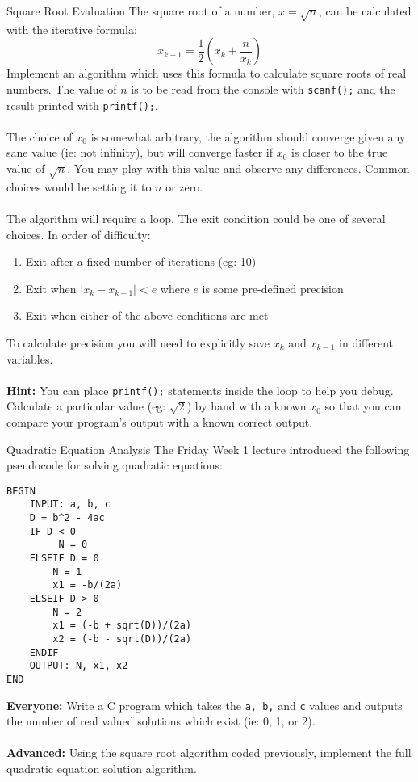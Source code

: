 \documentclass{lab}
\begin{document}
\begin{task}{Square Root Evaluation}{}
The square root of a number, $x = \sqrt{n}$, can be calculated with the iterative formula:
\begin{equation}
x_{k+1} = \frac{1}{2}\left(x_k + \frac{n}{x_k}\right)
\end{equation}
Implement an algorithm which uses this formula to calculate square roots of real numbers. The value of $n$ is to be read from the console with \texttt{scanf();} and the result printed with \texttt{printf();}.
\\ \\
The choice of $x_0$ is somewhat arbitrary, the algorithm should converge given any sane value (ie: not infinity), but will converge faster if $x_0$ is closer to the true value of $\sqrt{n}$. You may play with this value and observe any differences. Common choices would be setting it to $n$ or zero.
\\ \\
The algorithm will require a loop. The exit condition could be one of several choices. In order of difficulty:
\begin{enumerate}
\item Exit after a fixed number of iterations (eg: 10)
\item Exit when $\left| x_k - x_{k-1} \right| < e$ where $e$ is some pre-defined precision
\item Exit when either of the above conditions are met
\end{enumerate}

To calculate precision you will need to explicitly save $x_k$ and $x_{k-1}$ in different variables.
\\ \\
\textbf{Hint:} You can place \texttt{printf();} statements inside the loop to help you debug. Calculate a particular value (eg: $\sqrt{2}$) by hand with a known $x_0$ so that you can compare your program's output with a known correct output.
\end{task}

\begin{task}{Quadratic Equation Analysis}{}
The Friday Week 1 lecture introduced the following pseudocode for solving quadratic equations:
\begin{lstlisting}[style=pseudo]
BEGIN
	INPUT: a, b, c
	D = b^2 - 4ac
	IF D < 0
		 N = 0
	ELSEIF D = 0
		N = 1
		x1 = -b/(2a)
	ELSEIF D > 0
		N = 2
		x1 = (-b + sqrt(D))/(2a)
		x2 = (-b - sqrt(D))/(2a)
	ENDIF
	OUTPUT: N, x1, x2
END
\end{lstlisting}

\textbf{Everyone:} Write a C program which takes the \texttt{a, b,} and \texttt{c} values and outputs the number of real valued solutions which exist (ie: 0, 1, or 2).
\\ \\
\textbf{Advanced:} Using the square root algorithm coded previously, implement the full quadratic equation solution algorithm.
\end{task}
\end{document}
